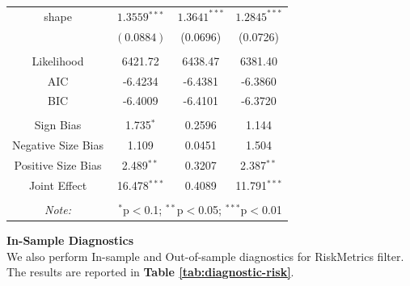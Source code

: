 \documentclass[a4paper]{article}
\begin{document}
\begin{table}[H]
\begin{tabular}{@{\extracolsep{4pt}} cccc}
shape & $1.3559$$^{***}$ & $1.3641^{***}$ & $1.2845^{***}$ \\ 
& $(0.0884)$ & (0.0696) & (0.0726) \\[1.8ex]

\hline \\[-1.8ex] 
Likelihood & 6421.72 & 6438.47 & 6381.40 \\ 
AIC& -6.4234 & -6.4381 & -6.3860 \\
BIC& -6.4009 & -6.4101 & -6.3720 \\

\hline \\[-1.8ex] 
Sign Bias & 1.735$^{*}$ & 0.2596 & 1.144 \\
Negative Size Bias & 1.109 & 0.0451 & 1.504 \\
Positive Size Bias & 2.489$^{**}$ & 0.3207 & 2.387$^{**}$ \\
Joint Effect & 16.478$^{***}$ & 0.4089 & 11.791$^{***}$ \\
\hline \\[-1.8ex] 

\textit{Note:}  & \multicolumn{3}{r}{$^{*}$p$<$0.1; $^{**}$p$<$0.05; $^{***}$p$<$0.01} \\ 
\end{tabular} 
\end{table} 


\textbf{In-Sample Diagnostics}\\

We also perform In-sample and Out-of-sample diagnostics for RiskMetrics filter. The results are reported in \textbf{Table \ref{tab:diagnostic-risk}}.

\end{document}
